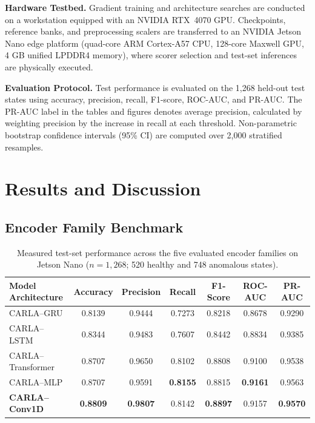 \documentclass[11pt,a4paper]{article}
\begin{document}
\textbf{Hardware Testbed.} Gradient training and architecture searches are conducted on a workstation equipped with an NVIDIA RTX~4070 GPU. Checkpoints, reference banks, and preprocessing scalers are transferred to an NVIDIA Jetson Nano edge platform (quad-core ARM Cortex-A57 CPU, 128-core Maxwell GPU, 4 GB unified LPDDR4 memory), where scorer selection and test-set inferences are physically executed.

\textbf{Evaluation Protocol.} Test performance is evaluated on the 1,268 held-out test states using accuracy, precision, recall, F1-score, ROC-AUC, and PR-AUC. The PR-AUC label in the tables and figures denotes average precision, calculated by weighting precision by the increase in recall at each threshold. Non-parametric bootstrap confidence intervals (95\% CI) are computed over 2,000 stratified resamples.

\section{Results and Discussion}
\label{sec:results}

\subsection{Encoder Family Benchmark}

\begin{table}[t]
\centering
\small
\caption{Measured test-set performance across the five evaluated encoder families on Jetson Nano ($n=1{,}268$; 520 healthy and 748 anomalous states).}
\label{tab:main-results}
\begin{tabular}{@{}lcccccc@{}}
\toprule
Model Architecture & Accuracy & Precision & Recall & F1-Score & ROC-AUC & PR-AUC \\
\midrule
CARLA--GRU & 0.8139 & 0.9444 & 0.7273 & 0.8218 & 0.8678 & 0.9290 \\
CARLA--LSTM & 0.8344 & 0.9483 & 0.7607 & 0.8442 & 0.8834 & 0.9385 \\
CARLA--Transformer & 0.8707 & 0.9650 & 0.8102 & 0.8808 & 0.9100 & 0.9538 \\
CARLA--MLP & 0.8707 & 0.9591 & \textbf{0.8155} & 0.8815 & \textbf{0.9161} & 0.9563 \\
\textbf{CARLA--Conv1D} & \textbf{0.8809} & \textbf{0.9807} & 0.8142 & \textbf{0.8897} & 0.9157 & \textbf{0.9570} \\
\bottomrule
\end{tabular}
\end{table}
\end{document}
